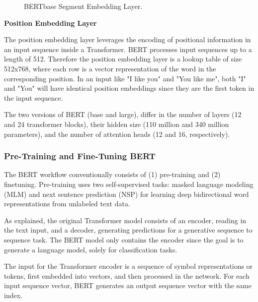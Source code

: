 \begin{figure}
    \caption{BERTbase Segment Embedding Layer.}
    \label{fig:BERT_segmentEmbedding}
\end{figure}


\textbf{Position Embedding Layer}

The position embedding layer leverages the encoding of positional information in an input sequence inside a Transformer. BERT processes input sequences up to a length of 512. Therefore the position embedding layer is a lookup table of size 512x768, where each row is a vector representation of the word in the corresponding position. In an input like "I like you" and "You like me", both "I" and "You" will have identical position embeddings since they are the first token in the input sequence. 

The two versions of BERT (base and large), differ in the number of layers (12 and 24 transformer blocks), their hidden size (110 million and 340 million parameters), and the number of attention heads (12 and 16, respectively).

\subsubsection{Pre-Training and Fine-Tuning BERT}
\label{sec:bert_pre-fine}
The BERT workflow conventionally consists of (1) pre-training and (2) finetuning. Pre-training uses two self-supervised tasks: masked language modeling (MLM) and next sentence prediction (NSP) for learning deep bidirectional word representations from unlabeled text data.

As explained, the original Transformer model consists of an encoder, reading in the text input, and a decoder, generating predictions for a generative sequence to sequence task. The BERT model only contains the encoder since the goal is to generate a language model, solely for classification tasks.

The input for the Transformer encoder is a sequence of symbol representations or tokens, first embedded into vectors, and then processed in the network. For each input sequence vector, BERT generates an output sequence vector with the same index.

